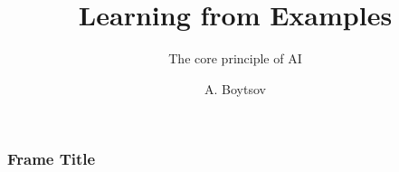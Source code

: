 \documentclass{beamer}
\title{Learning from Examples}
\subtitle{The core principle of AI}
\author{A. Boytsov}
\begin{document}
\begin{frame}[plain]
    \maketitle
\end{frame}
\begin{frame}
    \frametitle{Frame Title}
\end{frame}
\end{document}
